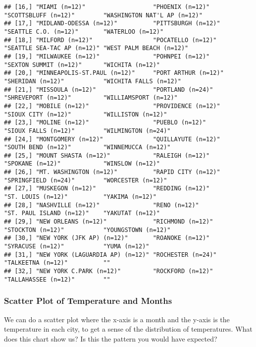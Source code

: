 \documentclass[
]{book}
\begin{document}
\begin{verbatim}
## [16,] "MIAMI (n=12)"                   "PHOENIX (n=12)"           "SCOTTSBLUFF (n=12)"        "WASHINGTON NAT'L AP (n=12)" 
## [17,] "MIDLAND-ODESSA (n=12)"          "PITTSBURGH (n=12)"        "SEATTLE C.O. (n=12)"       "WATERLOO (n=12)"            
## [18,] "MILFORD (n=12)"                 "POCATELLO (n=12)"         "SEATTLE SEA-TAC AP (n=12)" "WEST PALM BEACH (n=12)"     
## [19,] "MILWAUKEE (n=12)"               "POHNPEI (n=12)"           "SEXTON SUMMIT (n=12)"      "WICHITA (n=12)"             
## [20,] "MINNEAPOLIS-ST.PAUL (n=12)"     "PORT ARTHUR (n=12)"       "SHERIDAN (n=12)"           "WICHITA FALLS (n=12)"       
## [21,] "MISSOULA (n=12)"                "PORTLAND (n=24)"          "SHREVEPORT (n=12)"         "WILLIAMSPORT (n=12)"        
## [22,] "MOBILE (n=12)"                  "PROVIDENCE (n=12)"        "SIOUX CITY (n=12)"         "WILLISTON (n=12)"           
## [23,] "MOLINE (n=12)"                  "PUEBLO (n=12)"            "SIOUX FALLS (n=12)"        "WILMINGTON (n=24)"          
## [24,] "MONTGOMERY (n=12)"              "QUILLAYUTE (n=12)"        "SOUTH BEND (n=12)"         "WINNEMUCCA (n=12)"          
## [25,] "MOUNT SHASTA (n=12)"            "RALEIGH (n=12)"           "SPOKANE (n=12)"            "WINSLOW (n=12)"             
## [26,] "MT. WASHINGTON (n=12)"          "RAPID CITY (n=12)"        "SPRINGFIELD (n=24)"        "WORCESTER (n=12)"           
## [27,] "MUSKEGON (n=12)"                "REDDING (n=12)"           "ST. LOUIS (n=12)"          "YAKIMA (n=12)"              
## [28,] "NASHVILLE (n=12)"               "RENO (n=12)"              "ST. PAUL ISLAND (n=12)"    "YAKUTAT (n=12)"             
## [29,] "NEW ORLEANS (n=12)"             "RICHMOND (n=12)"          "STOCKTON (n=12)"           "YOUNGSTOWN (n=12)"          
## [30,] "NEW YORK (JFK AP) (n=12)"       "ROANOKE (n=12)"           "SYRACUSE (n=12)"           "YUMA (n=12)"                
## [31,] "NEW YORK (LAGUARDIA AP) (n=12)" "ROCHESTER (n=24)"         "TALKEETNA (n=12)"          ""                           
## [32,] "NEW YORK C.PARK (n=12)"         "ROCKFORD (n=12)"          "TALLAHASSEE (n=12)"        ""
\end{verbatim}

\hypertarget{scatter-plot-of-temperature-and-months}{%
\subsubsection{Scatter Plot of Temperature and Months}\label{scatter-plot-of-temperature-and-months}}

We can do a scatter plot where the x-axis is a month and the y-axis is the temperature in each city, to get a sense of the distribution of temperatures. What does this chart show us? Is this the pattern you would have expected?
\end{document}
